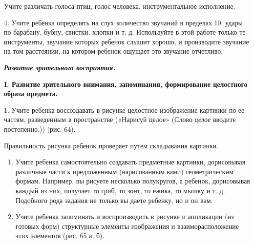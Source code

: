 \documentclass{book}
\renewcommand{\emph}[1]{\textit{#1}}
\begin{document}
Учите различать голоса птиц, голос человека, инструментальное
исполнение.

4. Учите ребенка определять на слух количество звучаний в пределах 10:
удары по барабану, бубну, свистки, хлопки и т. д. Используйте в этой
работе только те инструменты, звучание которых ребенок слышит хорошо, и
производите звучание на том расстоянии, на котором ребенок ощущает это
звучание отчетливо.

\emph{\textbf{Развитие зрительного восприятия.}}

\textbf{I. Развитие зрительного внимания, запоминания, формирование
целостного образа предмета.}

1. Учите ребенка воссоздавать в рисунке целостное изображение картинки
по ее частям, разведенным в пространстве («Нарисуй целое» (Слово
\emph{целое} вводите постепенно.)) (рис. 64).

Правильность рисунка ребенок проверяет путем складывания картинки.


\begin{enumerate}
\def\labelenumi{\arabic{enumi}.}
\setcounter{enumi}{1}
\item
  
  Учите ребенка самостоятельно создавать предметные картинки,
  дорисовывая различные части к предложенным (нарисованным вами)
  геометрическим формам. Например, вы рисуете несколько полукругов, а
  ребенок, дорисовывая каждый из них, получает то гриб, то зонт, то
  ежика, то мышку и т. д. Подобного рода задания не только вы даете
  ребенку, но и он вам.
  
\item
  
  Учите ребенка запоминать и воспроизводить в рисунке и аппликации (из
  готовых форм) структурные элементы изображения и взаиморасположение
  этих элементов (рис. 65 а, б).
  
\end{enumerate}
\end{document}
